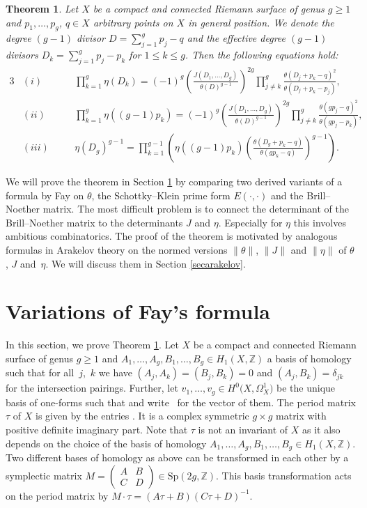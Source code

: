 \documentclass[10pt,a4paper]{amsart}
\numberwithin{equation}{section}
\newtheorem{Theorem}{Theorem}[section]
\begin{document}
\begin{Theorem}\label{mainthm}
	Let $X$ be a compact and connected Riemann surface of genus $g\ge 1$ and $p_1,\dots,p_g$, $q\in X$ arbitrary points on $X$ in general position. We denote the degree $(g-1)$ divisor $D=\sum_{j=1}^g p_j-q$ and the effective degree $(g-1)$ divisors $D_k=\sum_{j=1}^g p_j-p_k$ for $1\le k\le g$. Then the following equations hold:
\begin{alignat*}{3}
& (i)\quad &&\prod_{k=1}^g\eta(D_k)=(-1)^{g}\left(\frac{J(D_1,\dots,D_g)^{}}{\theta(D)^{g-1}}\right)^{2g}\prod_{j\neq k}^g\frac{\theta(D_j+p_k-q)^2}{\theta(D_j+p_k-p_j)},&\\
& (ii) \quad&& \prod_{k=1}^g\eta((g-1)p_k)=(-1)^{g}\left(\frac{J(D_1,\dots,D_g)^{}}{\theta(D)^{g-1}}\right)^{2g}\prod_{j\neq k}^g\frac{\theta(gp_j-q)^2}{\theta(gp_j-p_k)},&\\
& (iii) \quad && \eta(D_g)^{g-1}=\prod_{k=1}^{g-1}\left(\eta((g-1)p_k)\left(\frac{\theta(D_g+p_k-q)}{\theta(gp_k-q)}\right)^{g-1}\right).&
\end{alignat*}
\end{Theorem}

We will prove the theorem in Section \ref{secfay} by comparing two derived variants of a formula by Fay on $\theta$, the Schottky--Klein prime form $E(\cdot,\cdot)$ and the Brill--Noether matrix. The most difficult problem is to connect the determinant of the Brill--Noether matrix to the determinants $J$ and $\eta$. Especially for $\eta$ this involves ambitious combinatorics. The proof of the theorem is motivated by analogous formulas in Arakelov theory on the normed versions $\|\theta\|$, $\|J\|$ and $\|\eta\|$ of $\theta$, $J$ and~$\eta$. We will discuss them in Section \ref{secarakelov}.
\section{Variations of Fay's formula}\label{secfay}
In this section, we prove Theorem \ref{mainthm}.
Let $X$ be a compact and connected Riemann surface of genus $g\ge 1$ and $A_1,\dots,A_g,B_1,\dots,B_g\in H_1(X,\mathbb{Z})$ a basis of homology such that for all~$j$,~$k$ we have $(A_j,A_k)=(B_j,B_k)=0$ and $(A_j,B_k)=\delta_{jk}$ for the intersection pairings. Further, let $v_1,\dots,v_g\in H^0\bigl(X,\Omega_X^1\bigr)$ be the unique basis of one-forms such that  and write~ for the vector of them. The period matrix $\tau$ of $X$ is given by the entries . It is a complex symmetric $g\times g$ matrix with positive definite imaginary part. Note that $\tau$ is not an invariant of $X$ as it also depends on the choice of the basis of homology $A_1,\dots,A_g,B_1,\dots,B_g\in H_1(X,\mathbb{Z})$. Two different bases of homology as above can be transformed in each other by a symplectic matrix $M=\left(\begin{smallmatrix} A&B\\ C&D\end{smallmatrix}\right)\in\mathrm{Sp}(2g,\mathbb{Z})$. This basis transformation acts on the period matrix by $M\cdot \tau=(A\tau+B)(C\tau+D)^{-1}$.
\end{document}
